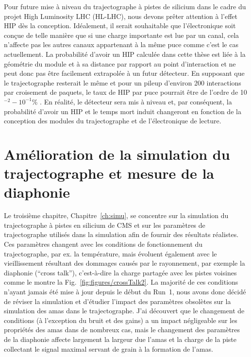 Pour future mise à niveau du trajectographe à pistes de silicium dans le cadre du projet High Luminosity LHC (HL-LHC), nous devons prêter attention à l’effet HIP dès la conception. Idéalement, il serait souhaitable que l’électronique soit conçue de telle manière que si une charge importante est lue par un canal, cela n’affecte pas les autres canaux appartenant à la même puce comme c’est le cas actuellement. La probabilité d'avoir un HIP calculée dans cette thèse est liée à la géométrie du module et à sa distance par rapport au point d'interaction et ne peut donc pas être facilement extrapolée à  un futur détecteur. En supposant que le trajectographe resterait le même et pour un pileup d'environ 200 interactions par croisement de paquets, le taux de HIP par puce pourrait être de l'ordre de 10$^{-2}-10 ^{-1}$\% . En réalité, le détecteur sera mis à niveau et, par conséquent, la probabilité d'avoir un HIP et le temps mort induit changeront en fonction de la conception des modules du trajectographe et de l’électronique de lecture.

\section{Amélioration de la simulation du trajectographe et mesure de la diaphonie}



Le troisième chapitre, Chapitre~\ref{ch:simu}, se concentre sur la simulation du trajectographe à  pistes en silicium de CMS et sur les paramètres de trajectographe utilisés dans la simulation afin de fournir des résultats réalistes. Ces paramètres changent avec les conditions de fonctionnement du trajectographe, par ex. la température, mais évoluent également avec le vieillissement résultant des dommages causés par le rayonnement, par exemple la diaphonie (``cross talk''), c'est-à-dire la charge partagée avec les pistes voisines comme le montre la Fig.~\ref{fig:figures/crossTalk2}. La majorité de ces conditions n’ayant jamais été mise à jour depuis le début du Run~1, nous avons donc décidé de réviser la simulation et d’étudier l’impact des paramètres obsolètes sur la simulation des amas dans le trajectographe. J'ai découvert que le changement de conditions (à l'exception du bruit et des gains) a un impact négligeable sur les propriétés des amas dans de nombreux cas, mais le changement des paramètres de la diaphonie affecte largement la largeur due l'amas et la charge de la piste collectant le signal maximal servant de grain à la formation de l'amas.

